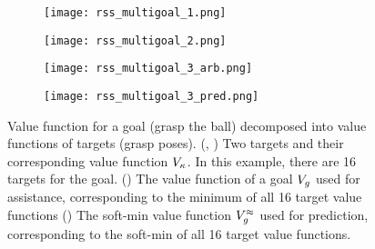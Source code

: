 \begin{figure}[t]
\centering
 \begin{subfigure}{0.24\textwidth}
   \centering 
   \texttt{[image: rss\_multigoal\_1.png]}
  \caption{}
 \label{fig:multigoal_1}
 \end{subfigure}
 \begin{subfigure}{0.24\textwidth}
   \centering 
   \texttt{[image: rss\_multigoal\_2.png]}
  \caption{}
 \label{fig:multigoal_2}
 \end{subfigure}
 \begin{subfigure}{0.24\textwidth}
   \centering 
   \texttt{[image: rss\_multigoal\_3\_arb.png]}
  \caption{}
 \label{fig:multigoal_3_arb}
 \end{subfigure}
 \begin{subfigure}{0.24\textwidth}
   \centering 
   \texttt{[image: rss\_multigoal\_3\_pred.png]}
  \caption{}
 \label{fig:multigoal_3_pred}
 \end{subfigure}
 \caption{Value function for a goal (grasp the ball) decomposed into value functions of targets (grasp poses). (, ) Two targets and their corresponding value function $V_{\kappa}$. In this example, there are 16 targets for the goal. () The value function of a goal $V_{g}$ used for assistance, corresponding to the minimum of all 16 target value functions () The soft-min value function $V^{\approx}_g$ used for prediction, corresponding to the soft-min of all 16 target value functions.}
 \label{fig:multigoal}
\end{figure}


